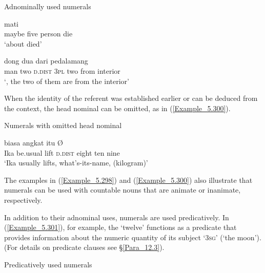 \begin{styleExampleTitle}
Adnominally used numerals
\end{styleExampleTitle}

\ea
\label{Example_5.298}
 {} {} {mati}\\ %
 maybe  five  person  die\\
\glt 
‘about  died’ \textstyleExampleSource{[081025-004-Cv.0033]}
\z

\ea
\label{Example_5.299}
 {} {} {dong} {dua} {dari} {pedalamang}\\ %
 man  two  \textsc{d.dist}  \textsc{3pl}  two  from  interior\\
\glt 
‘, the two of them are from the interior’ \textstyleExampleSource{[081109-010-JR.0001]}
\z


When the identity of the referent was established earlier or can be deduced from the context, the head nominal can be omitted, as in (\ref{Example_5.300}).


\begin{styleExampleTitle}
Numerals with omitted head nominal
\end{styleExampleTitle}

\ea
\label{Example_5.300}
 {biasa} {angkat} {itu} {} {} {} {Ø}\\ %
 Ika  be.usual  lift  \textsc{d.dist}  eight  ten  nine  \\
\glt 
‘Ika usually lifts, what’s-its-name,  (kilogram)’ \textstyleExampleSource{[081023-003-Cv.0004]}
\z


The examples in (\ref{Example_5.298}) and (\ref{Example_5.300}) also illustrate that numerals can be used with countable nouns that are animate or inanimate, respectively.



In addition to their adnominal uses, numerals are used predicatively. In (\ref{Example_5.301}), for example, the   ‘twelve’ functions as a predicate that provides information about the numeric quantity of its subject  ‘\textsc{3sg}’ (‘the moon’). (For details on  predicate clauses see §\ref{Para_12.3}).


\begin{styleExampleTitle}
Predicatively used numerals
\end{styleExampleTitle}

